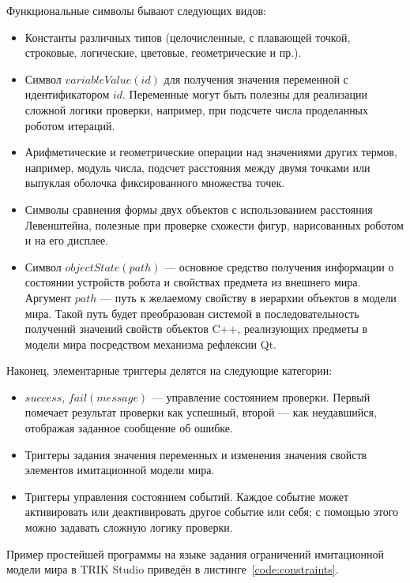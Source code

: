 \documentclass[conference]{IEEEtran}
\begin{document}
Функциональные символы бывают следующих видов:
\begin{itemize}
    \item Константы различных типов (целочисленные, с плавающей точкой, строковые, логические, цветовые, геометрические и пр.).
    \item Символ $variableValue(id)$ для получения значения переменной с идентификатором $id$. Переменные могут быть полезны для реализации сложной логики проверки, например, при подсчете числа проделанных роботом итераций.
    \item Арифметические и геометрические операции над значениями других термов, например, модуль числа, подсчет расстояния между двумя точками или выпуклая оболочка фиксированного множества точек.
    \item Символы сравнения формы двух объектов с использованием расстояния Левенштейна, полезные при проверке схожести фигур, нарисованных роботом и на его дисплее.
    \item Символ $objectState(path)$ --- основное средство получения информации о состоянии устройств робота и свойствах предмета из внешнего мира. Аргумент $path$ --- путь к желаемому свойству в иерархии объектов в модели мира. Такой путь будет преобразован системой в последовательность получений значений свойств объектов C++, реализующих предметы в модели мира посредством механизма рефлексии Qt.
\end{itemize}

Наконец, элементарные триггеры делятся на следующие категории:
\begin{itemize}
    \item $success$, $fail(message)$ --- управление состоянием проверки. Первый помечает результат проверки как успешный, второй --- как неудавшийся, отображая заданное сообщение об ошибке.
    \item Триггеры задания значения переменных и изменения значения свойств элементов имитационной модели мира.
    \item Триггеры управления состоянием событий. Каждое событие может активировать или деактивировать другое событие или себя; с помощью этого можно задавать сложную логику проверки.
\end{itemize}

Пример простейшей программы на языке задания ограничений имитационной модели мира в TRIK Studio приведён в листинге~\ref{code:constraints}.

\captionsetup[figure]{name=Листинг}
\setcounter{figure}{0}
\end{document}
